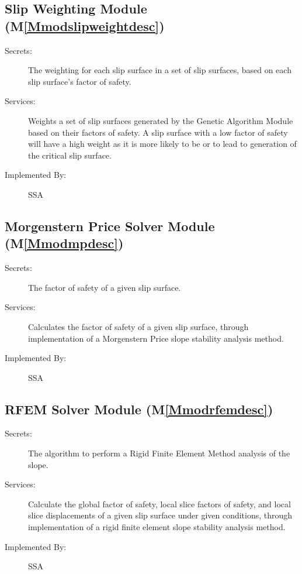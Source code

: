 \documentclass[12pt]{article}
\begin{document}
\subsection{Slip Weighting Module (M\ref{Mmodslipweightdesc})}
\label{Sec:SlipWeigModu()}
\begin{description}
\item[Secrets:]The weighting for each slip surface in a set of slip surfaces, based on each slip surface's factor of safety.
\item[Services:]Weights a set of slip surfaces generated by the Genetic Algorithm Module based on their factors of safety. A slip surface with a low factor of safety will have a high weight as it is more likely to be or to lead to generation of the critical slip surface.
\item[Implemented By:]SSA
\end{description}
\subsection{Morgenstern Price Solver Module (M\ref{Mmodmpdesc})}
\label{Sec:MorgPricSolvModu()}
\begin{description}
\item[Secrets:]The factor of safety of a given slip surface.
\item[Services:]Calculates the factor of safety of a given slip surface, through implementation of a Morgenstern Price slope stability analysis method.
\item[Implemented By:]SSA
\end{description}
\subsection{RFEM Solver Module (M\ref{Mmodrfemdesc})}
\label{Sec:RFEMSolvModu()}
\begin{description}
\item[Secrets:]The algorithm to perform a Rigid Finite Element Method analysis of the slope.
\item[Services:]Calculate the global factor of safety, local slice factors of safety, and local slice displacements of a given slip surface under given conditions, through implementation of a rigid finite element slope stability analysis method.
\item[Implemented By:]SSA
\end{description}
\end{document}
